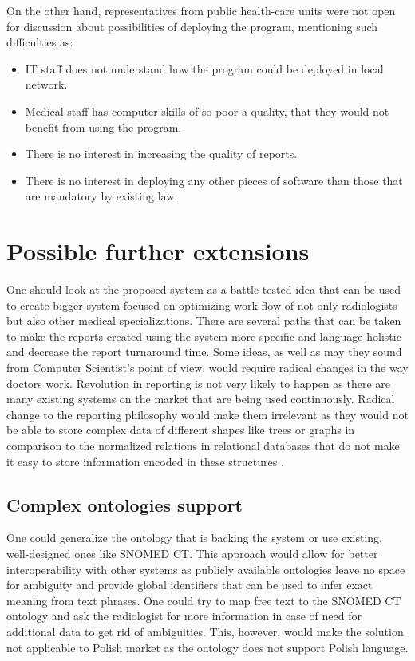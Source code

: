\documentclass[12pt, twoside, openany]{report}
\theoremstyle{definition}
\begin{document}
On the other hand, representatives from public health-care units were not open for discussion about possibilities of deploying the program, mentioning such difficulties as:
\begin{itemize}
\item IT staff does not understand how the program could be deployed in local network.
\item Medical staff has computer skills of so poor a quality, that they would not benefit from using the program.
\item There is no interest in increasing the quality of reports.
\item There is no interest in deploying any other pieces of software than those that are mandatory by existing law.
\end{itemize}



\section{Possible further extensions}
One should look at the proposed system as a battle-tested idea that can be used to create bigger system focused on optimizing work-flow of not only radiologists but also other medical specializations. There are several paths that can be taken to make the reports created using the system more specific and language holistic and decrease the report turnaround time. Some ideas, as well as may they sound from Computer Scientist's point of view, would require radical changes in the way doctors work. Revolution in reporting is not very likely to happen as there are many existing systems on the market that are being used continuously. Radical change to the reporting philosophy would make them irrelevant as they would not be able to store complex data of different shapes like trees or graphs in comparison to the normalized relations in relational databases that do not make it easy to store information encoded in these structures \cite{coelko-trees}. 

\subsection{Complex ontologies support}
One could generalize the ontology that is backing the system or use existing, well-designed ones like SNOMED CT. This approach would allow for better interoperability with other systems as publicly available ontologies leave no space for ambiguity and provide global identifiers that can be used to infer exact meaning from text phrases. One could try to map free text to the SNOMED CT ontology and ask the radiologist for more information in case of need for additional data to get rid of ambiguities. This, however, would make the solution not applicable to Polish market as the ontology does not support Polish language. 
\end{document}
